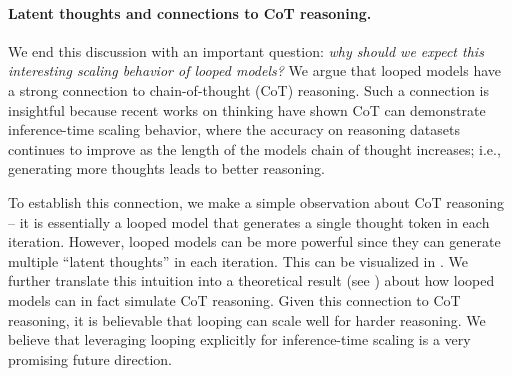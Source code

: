 {\begin{enumerate}[leftmargin=.15in, itemsep=1ex]
\end{enumerate}



\paragraph{Latent thoughts and connections to CoT reasoning.}
\label{sec:latent_thoughts}
We end this discussion with an important question: \emph{why should we expect this interesting scaling behavior of looped models?} We argue that looped models have a strong connection to chain-of-thought (CoT) reasoning. Such a connection is insightful because recent works on thinking have shown CoT can demonstrate inference-time scaling behavior, where the accuracy on reasoning datasets continues to improve as the length of the models chain of thought increases; i.e., generating more thoughts leads to better reasoning. 

To establish this connection, we make a simple observation about CoT reasoning -- it is essentially a looped model that generates a single thought token in each iteration.
However, looped models can be more powerful since they can generate multiple ``latent thoughts'' in each iteration. 
This can be visualized in .
We further translate this intuition into a theoretical result (see ) about how looped models can in fact simulate CoT reasoning.
Given this connection to CoT reasoning, it is believable that looping can scale well for harder reasoning.
We believe that leveraging looping explicitly for inference-time scaling is a very promising future direction.
}



% 





